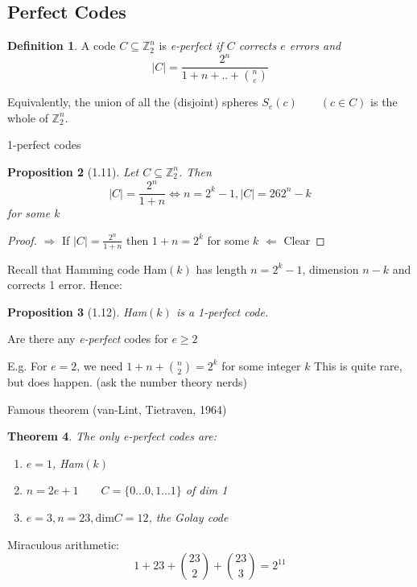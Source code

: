 \documentclass[amsfonts]{amsart}
\newtheorem{thm}{Theorem}[section]
\newtheorem{prop}[thm]{Proposition}
\theoremstyle{definition}
\newtheorem{defn}[thm]{Definition}
\theoremstyle{remark}
\numberwithin{equation}{section}
\begin{document}
\subsection{Perfect Codes}
\begin{defn}
	A code $C \subseteq \mathbb{Z}_2^n$ is  \em{e-perfect} if $C$ corrects $e$ errors and \newline
	\[
	|C| = \frac{2^n}{1 + n + .. + {n \choose e}}
	\]

	Equivalently, the union of all the (disjoint) spheres $S_e(c)\qquad (c\in C)$ is the whole of $\mathbb{Z}_2^n$.
\end{defn}

1-perfect codes

\begin{prop}[1.11]
	Let $C \subseteq \mathbb{Z}_2^n$. Then \newline
	\[
		|C| = \frac{2^n}{1+n} \iff n=2^k-1, |C| =26 2^n-k 
	\]
	for some $k$
\end{prop}

\begin{proof}
	
	$\Rightarrow$ \newline
	If $|C| = \frac{2^n}{1+n}$ then $1 +n = 2^k$ for some $k$ \newline
	$\Leftarrow$ Clear
\end{proof}

Recall that Hamming code Ham$(k)$ has length $n= 2^k-1$, dimension $n-k$ and corrects 1 error. Hence: \newline

\begin{prop}[1.12]
	Ham$(k)$ is a 1-perfect code.
\end{prop}

Are there any \emph{e-perfect} codes for $e\geq2$

E.g.\newline
For $e=2$, we need $1+n + {n \choose 2} = 2^k$ for some integer $k$ \newline
This is quite rare, but does happen. (ask the number theory nerds)
\par
Famous theorem (van-Lint, Tietraven, 1964)

\begin{thm}
The only \emph{e-perfect} codes are:
	\begin{enumerate}
		\item $e=1$, Ham$(k)$
		\item $n=2e+1\qquad C=\{0 ... 0, 1 ... 1\}$ of dim 1
		\item $e=3, n=23, \text{dim}C = 12$, the \em{Golay code}
	\end{enumerate}

\end{thm}
Miraculous arithmetic:\newline
\[
	1 + 23 + {23 \choose 2} + {23 \choose 3} = 2^{11}
\]
\end{document}
